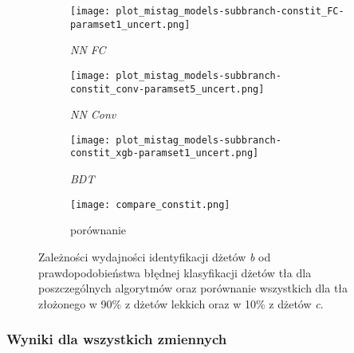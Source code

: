 \begin{figure}[h]
	\centering
	
    \begin{subfigure}[b]{0.49\textwidth}
	\texttt{[image: plot\_mistag\_models-subbranch-constit\_FC-paramset1\_uncert.png]}
	\caption{\textit{NN FC}}
	\end{subfigure}
    \begin{subfigure}[b]{0.49\textwidth}
	\texttt{[image: plot\_mistag\_models-subbranch-constit\_conv-paramset5\_uncert.png]}	
	\caption{\textit{NN Conv}}
	\end{subfigure}
    \begin{subfigure}[b]{0.49\textwidth}
	\texttt{[image: plot\_mistag\_models-subbranch-constit\_xgb-paramset1\_uncert.png]}
	\caption{\textit{BDT}}
	\end{subfigure}
	\begin{subfigure}[b]{0.49\textwidth}
	\texttt{[image: compare\_constit.png]}
	\caption{porównanie}
	\end{subfigure}
	
	\caption{Zależności wydajności identyfikacji dżetów \textit{b} od prawdopodobieństwa błędnej klasyfikacji dżetów tła dla poszczególnych algorytmów oraz porównanie wszystkich dla tła złożonego w 90\% z dżetów lekkich oraz w 10\% z dżetów \textit{c}.}
	\label{fig:ROC_constit}
\end{figure}


\FloatBarrier
\subsubsection{Wyniki dla wszystkich zmiennych}

